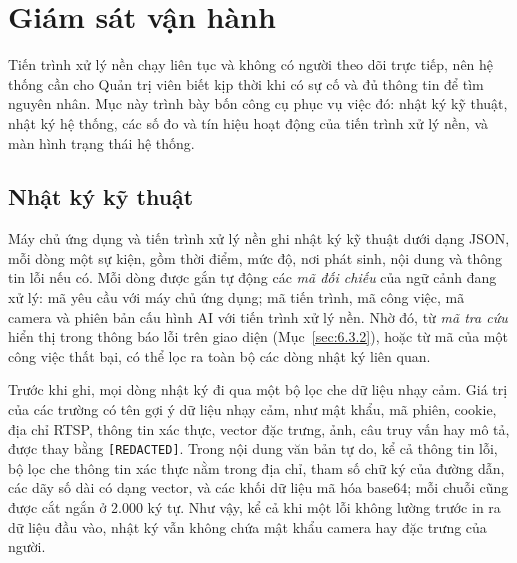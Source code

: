 \section{Giám sát vận hành}
\label{sec:6.4}

Tiến trình xử lý nền chạy liên tục và không có người theo dõi trực tiếp, nên hệ thống cần cho Quản trị viên biết kịp thời khi có sự cố và đủ thông tin để tìm nguyên nhân. Mục này trình bày bốn công cụ phục vụ việc đó: nhật ký kỹ thuật, nhật ký hệ thống, các số đo và tín hiệu hoạt động của tiến trình xử lý nền, và màn hình trạng thái hệ thống.

\subsection{Nhật ký kỹ thuật}
\label{sec:6.4.1}

Máy chủ ứng dụng và tiến trình xử lý nền ghi nhật ký kỹ thuật dưới dạng JSON, mỗi dòng một sự kiện, gồm thời điểm, mức độ, nơi phát sinh, nội dung và thông tin lỗi nếu có. Mỗi dòng được gắn tự động các \emph{mã đối chiếu} của ngữ cảnh đang xử lý: mã yêu cầu với máy chủ ứng dụng; mã tiến trình, mã công việc, mã camera và phiên bản cấu hình AI với tiến trình xử lý nền. Nhờ đó, từ \emph{mã tra cứu} hiển thị trong thông báo lỗi trên giao diện (Mục~\ref{sec:6.3.2}), hoặc từ mã của một công việc thất bại, có thể lọc ra toàn bộ các dòng nhật ký liên quan.

Trước khi ghi, mọi dòng nhật ký đi qua một bộ lọc che dữ liệu nhạy cảm. Giá trị của các trường có tên gợi ý dữ liệu nhạy cảm, như mật khẩu, mã phiên, cookie, địa chỉ RTSP, thông tin xác thực, vector đặc trưng, ảnh, câu truy vấn hay mô tả, được thay bằng \texttt{[REDACTED]}. Trong nội dung văn bản tự do, kể cả thông tin lỗi, bộ lọc che thông tin xác thực nằm trong địa chỉ, tham số chữ ký của đường dẫn, các dãy số dài có dạng vector, và các khối dữ liệu mã hóa base64; mỗi chuỗi cũng được cắt ngắn ở 2.000 ký tự. Như vậy, kể cả khi một lỗi không lường trước in ra dữ liệu đầu vào, nhật ký vẫn không chứa mật khẩu camera hay đặc trưng của người.

